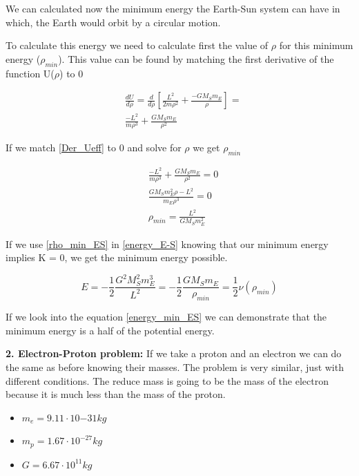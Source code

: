 We can calculated now the minimum energy the Earth-Sun system can have in which, the Earth would orbit by a circular motion.

To calculate this energy we need to calculate first the value of $\rho$ for this minimum energy ($\rho_{min}$). This value can be found by matching the first derivative of the function U($\rho$) to 0

\begin{equation}
    \label{Der_Ueff}
    \begin{split}
    &\frac{dU}{d\rho} = \frac{d}{d\rho}\left[ \frac{L^2}{2m\rho^2}+ \frac{ - G M_S m_E}{\rho}\right]=\\
    &\frac{-L^2}{m\rho^3}+\frac{G M_S m_E}{\rho^2}
    \end{split}
\end{equation}

If we match \ref{Der_Ueff} to 0 and solve for $\rho$ we get $\rho_{min}$

\begin{equation}
    \label{rho_min_ES}
    \begin{split}
    &\frac{-L^2}{m\rho^3}+\frac{G M_S m_E}{\rho^2} = 0\\
    &\frac{G M_S m_{E}^2\rho - L^2}{m_E\rho^3} = 0\\
    &\rho_{min} = \frac{L^2}{G M_S m_{E}^2}
    \end{split}
\end{equation}

If we use \ref{rho_min_ES} in \ref{energy_E-S} knowing that our minimum energy implies K = 0, we get the minimum energy possible.

\begin{equation}
    \label{energy_min_ES}
    E = -\frac{1}{2}\frac{G^2M_{S}^2m_{E}^3}{L^2} = -\frac{1}{2}\frac{G M_S m_{E}}{\rho_{min}}=\frac{1}{2}\nu(\rho_{min})
\end{equation}

If we look into the equation \ref{energy_min_ES} we can demonstrate that the minimum energy is a half of the potential energy.

\textbf{2. Electron-Proton problem:} If we take a proton and an electron we can do the same as before knowing their masses. The problem is very similar, just with different conditions. The reduce mass is going to be the mass of the electron because it is much less than the mass of the proton.

\begin{itemize}
    \item $m_e = 9.11 \cdot 10{-31} kg$
    \item $m_p = 1.67\cdot 10^{-27} kg$
    \item $G = 6.67 \cdot 10^{11} kg$
\end{itemize}

